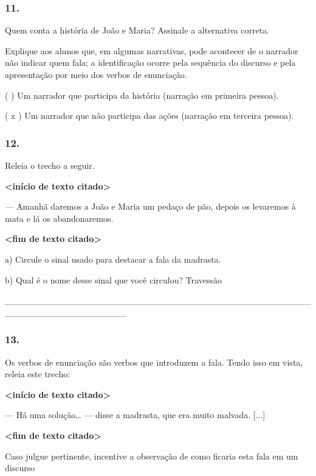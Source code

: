 \subsubsection{11. }\label{section-26}

Quem conta a história de João e Maria? Assinale a alternativa correta.

Explique aos alunos que, em algumas narrativas, pode acontecer de o
narrador não indicar quem fala; a identificação ocorre pela sequência do
discurso e pela apresentação por meio dos verbos de enunciação.

( ) Um narrador que participa da história (narração em primeira pessoa).

( x ) Um narrador que não participa das ações (narração em terceira
pessoa).

\subsubsection{12. }\label{section-27}

Releia o trecho a seguir.

\textbf{\textless{}início de texto citado\textgreater{}}

\emph{---} Amanhã daremos a João e Maria um pedaço de pão, depois os
levaremos à mata e lá os abandonaremos.

\textbf{\textless{}fim de texto citado\textgreater{}}

a) Circule o sinal usado para destacar a fala da madrasta.

b) Qual é o nome desse sinal que você circulou? Travessão

\_\_\_\_\_\_\_\_\_\_\_\_\_\_\_\_\_\_\_\_\_\_\_\_\_\_\_\_\_\_\_\_\_\_\_\_\_\_\_\_\_\_\_\_\_\_\_\_\_\_\_\_\_\_\_\_\_\_\_\_\_\_\_\_\_\_\_

\subsubsection{13. }\label{section-28}

Os verbos de enunciação são verbos que introduzem a fala. Tendo isso em
vista, releia este trecho:

\textbf{\textless{}início de texto citado\textgreater{}}

--- Há uma solução\ldots{} --- disse a madrasta, que era muito malvada.
{[}...{]}

\textbf{\textless{}fim de texto citado\textgreater{}}

Caso julgue pertinente, incentive a observação de como ficaria esta fala
em um discurso

